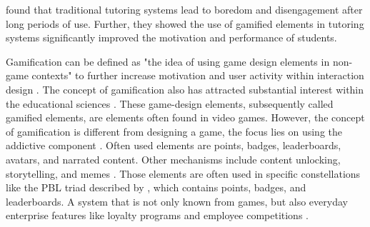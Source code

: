 \textcite{jacksonMotivationPerformanceGamebased2013} found that traditional tutoring systems lead to boredom and disengagement after long periods of use. Further, they showed the use of gamified elements in tutoring systems significantly improved the motivation and performance of students.


Gamification can be defined as "the idea of using game design elements in non-game contexts" \parencite{deterdingGameDesignElements2011} to further increase motivation and user activity within interaction design \parencite{deterdingGameDesignElements2011}.
The concept of gamification also has attracted substantial interest within the educational sciences \parencite{swachaStateResearchGamification2021}.
These game-design elements, subsequently called gamified elements, are elements often found in video games.
However, the concept of gamification is different from designing a game, the focus lies on using the addictive component \parencite{gonzalezGamificationIntelligentTutoring2014}.
Often used elements are points, badges, leaderboards, avatars, and narrated content. Other mechanisms include content unlocking, storytelling, and memes \parencite{zainuddinImpactGamificationLearning2020}.
Those elements are often used in specific constellations like the PBL triad described by \textcite{werbachWinHowGame2012}, which contains points, badges, and leaderboards.
A system that is not only known from games, but also everyday enterprise features like loyalty programs and employee competitions \parencite{werbachWinHowGame2012}.

